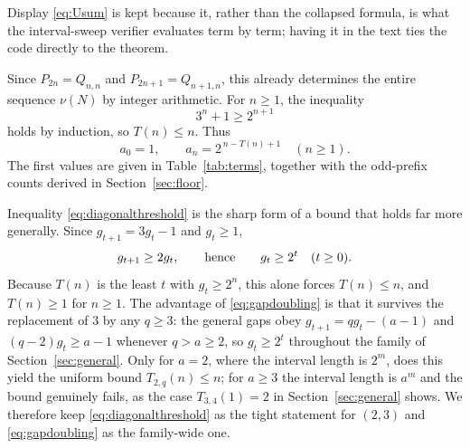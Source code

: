 \documentclass[11pt,letterpaper]{article}
\numberwithin{equation}{section}
\theoremstyle{definition}
\theoremstyle{remark}
\begin{document}
Display \eqref{eq:Usum} is kept because it, rather than the collapsed
formula, is what the interval-sweep verifier evaluates term by term; having
it in the text ties the code directly to the theorem.

Since $P_{2n}=Q_{n,n}$ and $P_{2n+1}=Q_{n+1,n}$, this already determines
the entire sequence $\nu(N)$ by integer arithmetic.
For $n\ge1$, the inequality
\begin{equation}\label{eq:diagonalthreshold}
 3^n+1\ge2^{n+1}
\end{equation}
holds by induction, so $T(n)\le n$. Thus
\begin{equation}\label{eq:diagonalcount}
 a_0=1,\qquad a_n=2^{\,n-T(n)+1}\quad(n\ge1).
\end{equation}
The first values are given in Table~\ref{tab:terms}, together with the
odd-prefix counts derived in Section~\ref{sec:floor}.

Inequality \eqref{eq:diagonalthreshold} is the sharp form of a bound that
holds far more generally. Since $g_{t+1}=3g_t-1$ and $g_t\ge1$,
\begin{equation}\label{eq:gapdoubling}
 g_{t+1}\ge2g_t,\qquad\hbox{hence}\qquad g_t\ge2^t\quad(t\ge0).
\end{equation}
Because $T(n)$ is the least $t$ with $g_t\ge2^n$, this alone forces
$T(n)\le n$, and $T(n)\ge1$ for $n\ge1$. The advantage of
\eqref{eq:gapdoubling} is that it survives the replacement of $3$ by any
$q\ge3$: the general gaps obey $g_{t+1}=qg_t-(a-1)$ and
$(q-2)g_t\ge a-1$ whenever $q>a\ge2$, so $g_t\ge2^t$ throughout the family
of Section~\ref{sec:general}. Only for $a=2$, where the interval length is
$2^m$, does this yield the uniform bound $T_{2,q}(n)\le n$; for $a\ge3$ the
interval length is $a^m$ and the bound genuinely fails, as the case
$T_{3,4}(1)=2$ in Section~\ref{sec:general} shows. We therefore keep
\eqref{eq:diagonalthreshold} as the tight statement for $(2,3)$ and
\eqref{eq:gapdoubling} as the family-wide one.
\end{document}
